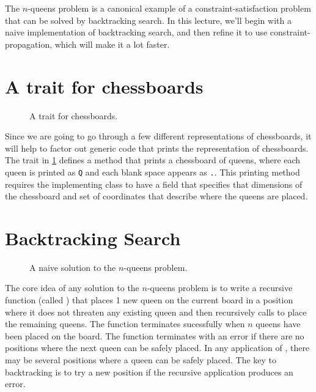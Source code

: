 \documentclass[9pt]{extbook}
\begin{document}
The $n$-queens problem is a canonical example of a constraint-satisfaction
problem that can be solved by backtracking search. In this lecture, we'll
begin with a naive implementation of backtracking search, and then refine
it to use constraint-propagation, which will make it a lot faster.

\section{A trait for chessboards}

\begin{figure}
\caption{A trait for chessboards.}
\label{ChessBoardLike}
\end{figure}

Since we are going to go through a few different representations of chessboards,
it will help to factor out generic code that prints the representation of
chessboards. The  trait in \cref{ChessBoardLike}
defines a  method that prints a chessboard of queens,
where each queen is printed as \texttt{Q} and each blank space appears as
\texttt{.}. This printing method requires the implementing class to have
a field that specifies that dimensions of the chessboard and set of coordinates
that describe where the queens are placed.

\section{Backtracking Search}

\begin{figure}
\caption{A naive solution to the $n$-queens problem.}
\label{NaiveQueens}
\end{figure}

The core idea of any solution to the $n$-queens problem is to write a recursive
function (called ) that places 1 new queen on the current
board in a position where it does not threaten any existing queen and then
recursively calls  to place the remaining queens. The
function terminates sucessfully when $n$ queens have been placed on the board.
The function terminates with an error if there are no positions where the next
queen can be safely placed. In any application of , there may
be several positions where a queen can be safely placed. The key to backtracking
is to try a new position if the recursive application produces an error.
\end{document}
